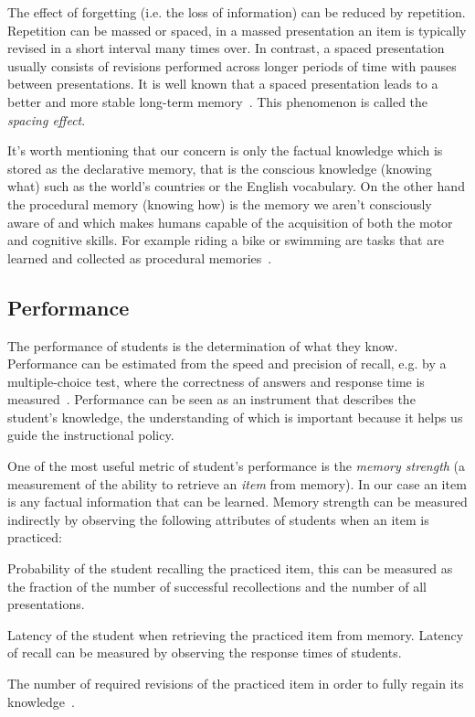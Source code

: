 The effect of forgetting (i.e. the loss of information) can be reduced by repetition. Repetition can be massed or spaced, in a massed presentation an item is typically revised in a short interval many times over. In contrast, a spaced presentation usually consists of revisions performed across longer periods of time with pauses between presentations. It is well known that a spaced presentation leads to a better and more stable long-term memory~\cite{RichardE.Mayer2010}. This phenomenon is called the \textit{spacing effect}.

It's worth mentioning that our concern is only the factual knowledge which is stored as the declarative memory, that is the conscious knowledge (knowing what) such as the world's countries or the English vocabulary. On the other hand the procedural memory (knowing how) is the memory we aren't consciously aware of and which makes humans capable of the acquisition of both the motor and cognitive skills. For example riding a bike or swimming are tasks that are learned and collected as procedural memories~\cite{MichaelW.Eysenck2008}.

\subsection{Performance}

The performance of students is the determination of what they know. Performance can be estimated from the speed and precision of recall, e.g. by a multiple-choice test, where the correctness of answers and response time is measured~\cite{Lewis}. Performance can be seen as an instrument that describes the student's knowledge, the understanding of which is important because it helps us guide the instructional policy.

One of the most useful metric of student's performance is the \textit{memory strength} (a measurement of the ability to retrieve an \textit{item} from memory). In our case an item is any factual information that can be learned. Memory strength can be measured indirectly by observing the following attributes of students when an item is practiced:

\begin{description}[leftmargin=0cm]
  \item[Probability of recall] Probability of the student recalling the practiced item, this can be measured as the fraction of the number of successful recollections and the number of all presentations.
  \item[Latency of recall] Latency of the student when retrieving the practiced item from memory. Latency of recall can be measured by observing the response times of students.
  \item[Savings in relearning] The number of required revisions of the practiced item in order to fully regain its knowledge~\cite{MichaelW.Eysenck2008}.
\end{description}

